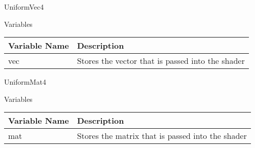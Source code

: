 \documentclass[../../Main.tex]{subfiles}
\begin{document}
    UniformVec4
    \begin{center}
        Variables
        \begin{tabular}{ | m{} | m{} | }
            \hline
            \textbf{Variable Name} & \textbf{Description} \\
            \hline
            vec & Stores the vector that is passed into the shader \\
            \hline
        \end{tabular}
    \end{center}
    UniformMat4
    \begin{center}
        Variables
        \begin{tabular}{ | m{} | m{} | }
            \hline
            \textbf{Variable Name} & \textbf{Description} \\
            \hline
            mat & Stores the matrix that is passed into the shader \\
            \hline
        \end{tabular}
    \end{center}
\end{document}
